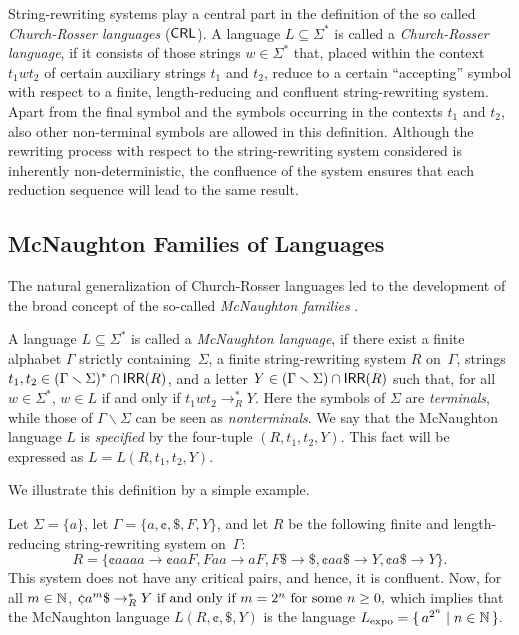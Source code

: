 String-rewriting systems play a central part in the definition of the so called \emph{Church-Rosser languages} ($\textup{\sf CRL}$). A language $L \subseteq \Sigma^*$ is called a \emph{Church-Rosser language}, if it consists of those strings $w \in \Sigma^*$ that, placed within the context $t_1 w t_2$ of certain auxiliary strings $t_1$ and $t_2$, reduce to a certain ``accepting'' symbol with respect to a finite, length-reducing and confluent string-rewriting system. Apart from the final symbol and the symbols occurring in the contexts $t_1$ and $t_2$, also other non-terminal symbols are allowed in this definition. Although the rewriting process with respect to the string-rewriting system considered is inherently non-deterministic, the confluence of the system ensures that each reduction sequence will lead to the same result.

\subsection{McNaughton Families of Languages}
\label{subsection:mcnaughton-families}

The natural generalization of Church-Rosser languages led to the development of the broad concept of the so-called \emph{McNaughton families} \cite{Beaudry2003}.

A language $L\subseteq \Sigma^*$ is called a \emph{McNaughton language}, if there exist a finite alphabet $\Gamma$ strictly containing~$\Sigma$, a finite string-rewriting system $R$ on~$\Gamma$, strings $t_1,t_2\in(\Gamma\smallsetminus\Sigma)^*\cap \textup{\sf IRR}(R)$, and a letter $Y\in(\Gamma\smallsetminus\Sigma)\cap \textup{\sf IRR}(R)$ such that, for all $w\in\Sigma^*$, $w\in L$ if and only if $t_1wt_2\rightarrow^*_R Y$. Here the symbols of $\Sigma$ are \emph{terminals}, while those of $\Gamma\smallsetminus\Sigma$ can be seen as \emph{nonterminals}. We say that the McNaughton language $L$ is \emph{specified} by the four-tuple $(R,t_1,t_2,Y)$. This fact will be expressed as $L = L(R,t_1,t_2,Y)$.

We illustrate this definition by a simple example.

\begin{example}\label{ExMcNL}
Let $\Sigma=\{a\}$, let $\Gamma=\{a,\cent,\$,F,Y\}$, and let $R$ be the following finite and length-reducing string-rewriting system on~$\Gamma$: $$R=\{\cent aaaa\to \cent aaF, Faa\to aF, F\$\to \$, \cent aa\$ \to Y, \cent a\$\to Y\}.$$ This system does not have any critical pairs, and hence, it is confluent. Now, for all $m\in \mathbb{N}$, $\cent a^m\$\rightarrow_R^* Y\textup{ if and only if } m=2^n\textup{ for some }n\ge 0,$ which implies that the McNaughton language $L(R,\cent,\$,Y)$ is the language $L_{\rm expo} = \{\,a^{2^n}\mid n\in \mathbb{N}\,\}.$
\end{example}


